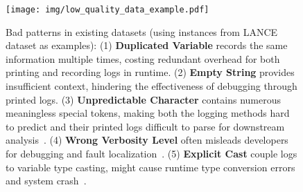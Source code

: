     \begin{figure}[t]
    \centering
    \texttt{[image: img/low\_quality\_data\_example.pdf]}
    \caption{Bad patterns in existing datasets (using instances from LANCE dataset as examples): (1) \textbf{Duplicated Variable} records the same information multiple times, costing redundant overhead for both printing and recording logs in runtime. (2) \textbf{Empty String} provides insufficient context, hindering the effectiveness of debugging through printed logs. (3) \textbf{Unpredictable Character} contains numerous meaningless special tokens, making both the logging methods hard to predict and their printed logs difficult to parse for downstream analysis~\cite {gojko2006logging}. (4) \textbf{Wrong Verbosity Level} often misleads developers for debugging and fault localization~\cite{Chen2017CharacterizingAD}. (5) \textbf{Explicit Cast} couple logs to variable type casting, might cause runtime type conversion errors and system crash~\cite{Chen2017CharacterizingAD}.
    }
    \label{fig:low_quality}
    \end{figure}




